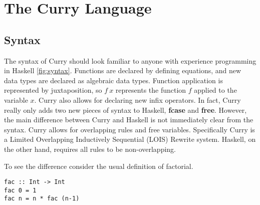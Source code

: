 \documentclass{article}
\begin{document}

\section{The Curry Language}

\subsection{Syntax}

The syntax of Curry should look familiar to anyone with experience programming in Haskell \ref{fig:syntax}.
Functions are declared by defining equations, and new data types are declared as algebraic data types.
Function application is represented by juxtaposition, so $f\ x$ represents the function $f$ applied to the variable $x$.
Curry also allows for declaring new infix operators.
In fact, Curry really only adds two new pieces of syntax to Haskell, \textbf{fcase} and \textbf{free}.
However, the main difference between Curry and Haskell is not immediately clear from the syntax.
Curry allows for overlapping rules and free variables.
Specifically Curry is a Limited Overlapping Inductively Sequential (LOIS) Rewrite system.
Haskell, on the other hand, requires all rules to be non-overlapping.

To see the difference consider the usual definition of factorial.
\begin{verbatim}
fac :: Int -> Int
fac 0 = 1
fac n = n * fac (n-1)
\end{verbatim}
\end{document}

